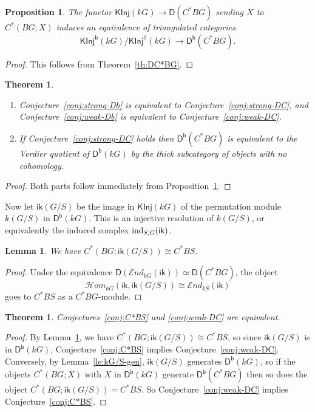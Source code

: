 \documentclass[12pt]{amsart}
\newcommand{\DD}{\mathsf{D}}%
\newcommand{\Db}{\DD^{\mathsf{b}}}%
\newcommand{\iEnd}{\mathcal{E}\mathit{nd}}%
\newcommand{\iHom}{\mathcal{H}\mathit{om}}%
\newcommand{\ik}{\mathsf{ik}}
\newcommand{\ind}{\mathop{\rm ind}}
\newcommand{\kG}{\kk G}
\newcommand{\kk}{k}
\newcommand{\KInj}{\mathsf{KInj}}
\newcommand{\KInjb}{\KInj^{\mathsf{b}}}
\numberwithin{equation}{section}
\theoremstyle{plain}
\newtheorem{lemma}[equation]{Lemma}
\newtheorem{theorem}[equation]{Theorem}
\newtheorem{proposition}[equation]{Proposition}
\theoremstyle{definition}
\theoremstyle{remark}
\begin{document}
\begin{proposition}\label{pr:DbC*BG}
The functor $\KInj(\kG) \to \DD(C^*BG)$ sending $X$ to $C^*(BG;X)$
induces an equivalence of triangulated categories
\[ \KInjb(\kG)/\KInj^0(\kG) \to \Db(C^*BG). \]
\end{proposition}
\begin{proof}
This follows from Theorem~\ref{th:DC*BG}.
\end{proof}

\begin{theorem}\label{th:DbC*BG2}
\begin{enumerate}
\item[\rm (i)]
Conjecture~\ref{conj:strong-Db} is equivalent
to Conjecture~\ref{conj:strong-DC}, and 
Conjecture~\ref{conj:weak-Db} is equivalent to
Conjecture~\ref{conj:weak-DC}.
\item[\rm (ii)]
If Conjecture~\ref{conj:strong-DC} holds then $\Db(C^*BG)$ is
equivalent to the
Verdier quotient of $\Db(\kG)$ by the thick subcategory of objects with
no cohomology.
\end{enumerate}
\end{theorem}
\begin{proof}
Both parts follow immediately from Proposition~\ref{pr:DbC*BG}.
\end{proof}



Now let $\ik(G/S)$ be the image in $\KInj(\kG)$ of the permutation
module $\kk(G/S)$ in $\Db(\kG)$. This is an injective resolution of
$\kk(G/S)$, or equivalently the induced complex $\ind_{S,G}(\ik)$.

\begin{lemma}\label{le:kG/S}
We have $C^*(BG;\ik(G/S))\cong C^*BS$.
\end{lemma}
\begin{proof}
Under the equivalence $\DD(\iEnd_{\kG}(\ik))\simeq\DD(C^*BG)$, the
object 
\[ \iHom_{\kG}(\ik,\ik(G/S)) \cong \iEnd_{\kk S}(\ik) \] 
goes to $C^*BS$ as a $C^*BG$-module.
\end{proof}


\begin{theorem}\label{th:C*BS-equivalent}
Conjectures~\ref{conj:C*BS} and \ref{conj:weak-DC} are equivalent.
\end{theorem}
\begin{proof}
By Lemma~\ref{le:kG/S}, we have $C^*(BG;\ik(G/S))\cong C^*BS$, so 
since $\ik(G/S)$ is in $\Db(\kG)$,
Conjecture~\ref{conj:C*BS} implies
Conjecture~\ref{conj:weak-DC}. Conversely, by Lemma~\ref{le:kG/S-gen},
$\ik(G/S)$ generates $\Db(\kG)$, so if the objects $C^*(BG;X)$ with
$X$ in $\Db(\kG)$ generate $\Db(C^*BG)$ then so does the object
$C^*(BG;\ik(G/S))=C^*BS$. So Conjecture~\ref{conj:weak-DC} implies
Conjecture~\ref{conj:C*BS}. 
\end{proof}
\end{document}
